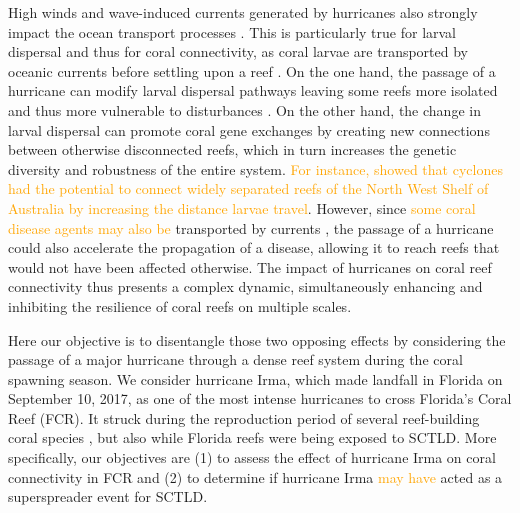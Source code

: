 \documentclass[fleqn,10pt]{wlscirep}
\newcommand{\modif}[1]{\textcolor{orange}{#1}}
\begin{document}
High winds and wave-induced currents generated by hurricanes also strongly impact the ocean transport processes \citep{DobbyIrma,Oey2007May,liu2020impacts}. This is particularly true for larval dispersal and thus for coral connectivity, as coral larvae are transported by oceanic currents before settling upon a reef \citep{Shulman1995Oct}. On the one hand, the passage of a hurricane can modify larval dispersal pathways leaving some reefs more isolated and thus more vulnerable to disturbances \citep{grimaldi2022hydrodynamic}. On the other hand, the change in larval dispersal can promote coral gene exchanges by creating new connections between otherwise disconnected reefs, which in turn increases the genetic diversity and robustness of the entire system. \modif{For instance, \cite{radford2014cyclones} showed that cyclones had the potential to connect widely separated reefs of the North West Shelf of Australia by increasing the distance larvae travel}. However, since \modif{some coral disease agents may also be} transported by currents \citep{DobbySCTLD}, the passage of a hurricane could also accelerate the propagation of a disease, allowing it to reach reefs that would not have been affected otherwise. The impact of hurricanes on coral reef connectivity thus presents a complex dynamic, simultaneously enhancing and inhibiting the resilience of coral reefs on multiple scales.

Here our objective is to disentangle those two opposing effects by considering the passage of a major hurricane through a dense reef system during the coral spawning season. We consider hurricane Irma, which made landfall in Florida on September 10, 2017, as one of the most intense hurricanes to cross Florida's Coral Reef (FCR). It struck during the reproduction period of several reef-building coral species \citep{quicklook2020}, but also while Florida reefs were being exposed to SCTLD. More specifically, our objectives are (1) to assess the effect of hurricane Irma on coral connectivity in FCR and (2) to determine if hurricane Irma \modif{may have} acted as a superspreader event for SCTLD.
\end{document}
